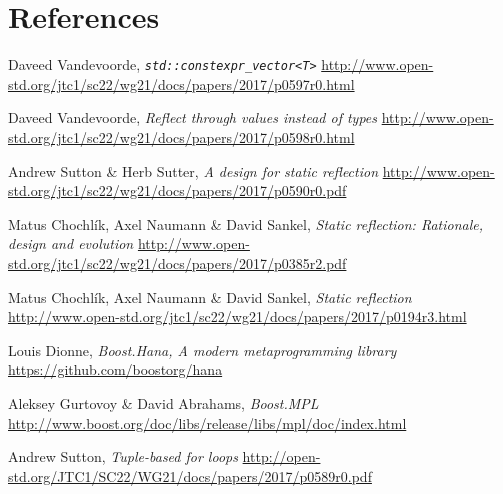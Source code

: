 \documentclass{wg21}
\newcommand{\cc}[1]{\texttt{#1}}
\begin{document}
\section{References}
\renewcommand{\section}[2]{}%
\begin{thebibliography}{9}

    Daveed Vandevoorde,
    \emph{\cc{std::constexpr_vector<T>}}\newline
    \url{http://www.open-std.org/jtc1/sc22/wg21/docs/papers/2017/p0597r0.html}

    Daveed Vandevoorde,
    \emph{Reflect through values instead of types}\newline
    \url{http://www.open-std.org/jtc1/sc22/wg21/docs/papers/2017/p0598r0.html}

    Andrew Sutton \& Herb Sutter,
    \emph{A design for static reflection}\newline
    \url{http://www.open-std.org/jtc1/sc22/wg21/docs/papers/2017/p0590r0.pdf}

    Matus Chochlík, Axel Naumann \& David Sankel,
    \emph{Static reflection: Rationale, design and evolution}\newline
    \url{http://www.open-std.org/jtc1/sc22/wg21/docs/papers/2017/p0385r2.pdf}

    Matus Chochlík, Axel Naumann \& David Sankel,
    \emph{Static reflection}\newline
    \url{http://www.open-std.org/jtc1/sc22/wg21/docs/papers/2017/p0194r3.html}

    Louis Dionne,
    \emph{Boost.Hana, A modern metaprogramming library}\newline
    \url{https://github.com/boostorg/hana}

    Aleksey Gurtovoy \& David Abrahams,
    \emph{Boost.MPL}\newline
    \url{http://www.boost.org/doc/libs/release/libs/mpl/doc/index.html}

    Andrew Sutton,
    \emph{Tuple-based for loops}\newline
    \url{http://open-std.org/JTC1/SC22/WG21/docs/papers/2017/p0589r0.pdf}

\end{thebibliography}
\end{document}
